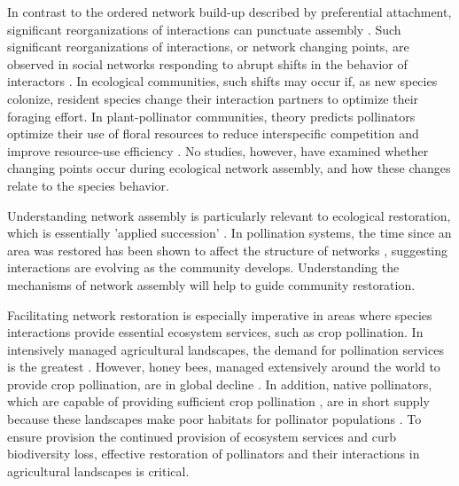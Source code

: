 \documentclass[12pt]{article}
\begin{document}
In contrast to the ordered network build-up described by preferential
attachment, significant reorganizations of interactions can punctuate
assembly \citep{peel2014detecting}. Such significant reorganizations
of interactions, or network changing points, are observed in social
networks responding to abrupt shifts in the behavior of interactors
\citep{peel2014detecting}.  In ecological communities, such shifts may
occur if, as new species colonize, resident species change their
interaction partners to optimize their foraging effort. In
plant-pollinator communities, theory predicts pollinators optimize
their use of floral resources to reduce interspecific competition and
improve resource-use efficiency \citep{pyke1984optimal,
  valdovinos2010consequences, valdovinos2013adaptive,
  albrecht2010plant, Bluthgen2007}. No studies, however, have examined
whether changing points occur during ecological network assembly, and
how these changes relate to the species behavior.

Understanding network assembly is particularly relevant to ecological
restoration, which is essentially 'applied succession'
\citep[e.g.,][]{parker1997scale}. In pollination systems, the time
since an area was restored has been shown to affect the structure of
networks \citep{forup-2008-742, forup2008restoration,
  devoto2012understanding}, suggesting interactions are evolving as
the community develops. Understanding the mechanisms of network
assembly will help to guide community restoration.

Facilitating network restoration is especially imperative in areas
where species interactions provide essential ecosystem services, such
as crop pollination. In intensively managed agricultural landscapes,
the demand for pollination services is the greatest
\citep{kremen-2008-10}. However, honey bees, managed extensively
around the world to provide crop pollination, are in global decline
\citep{neumann-2010-1, van-engelsdorp-2009-e6481}. In addition, native
pollinators, which are capable of providing sufficient crop
pollination \citep{kremen-2002-16816, winfree-2007-1105,
  kremen-2004-1109}, are in short supply because these landscapes make
poor habitats for pollinator populations \citep{kremen-2002-16816}. To
ensure provision the continued provision of ecosystem services and
curb biodiversity loss, effective restoration of pollinators and their
interactions in agricultural landscapes is critical.
\end{document}

